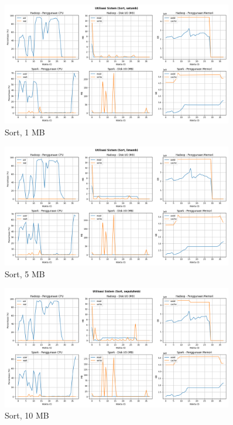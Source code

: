 \begin{figure}[h]
    \centering
    \includegraphics[width=0.9\textwidth]{figures/ch04/5-util-sistem-sort-satumb.png}
    \caption*{Sort, 1 MB}
\end{figure}

\begin{figure}[h]
    \centering
    \includegraphics[width=0.9\textwidth]{figures/ch04/5-util-sistem-sort-limamb.png}
    \caption*{Sort, 5 MB}
\end{figure}

\begin{figure}[h]
    \centering
    \includegraphics[width=0.9\textwidth]{figures/ch04/5-util-sistem-sort-sepuluhmb.png}
    \caption*{Sort, 10 MB}
\end{figure}

